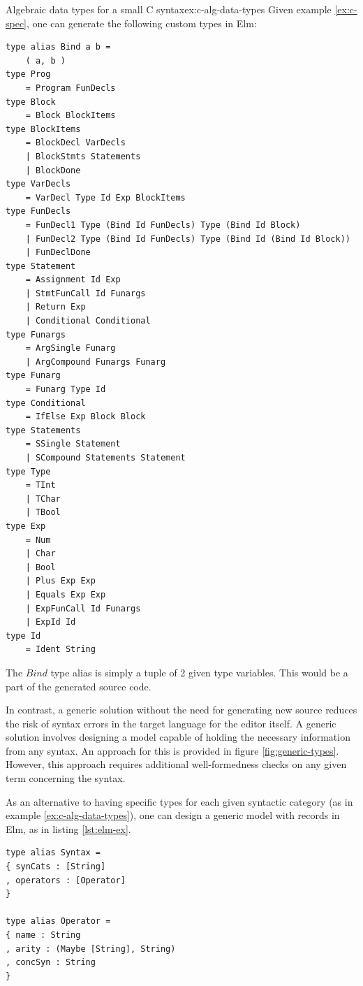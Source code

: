 \documentclass{article}
\begin{document}
\begin{example}{Algebraic data types for a small C syntax}{ex:c-alg-data-types}
Given example \ref{ex:c-spec}, one can generate the following custom types in Elm:
\begin{lstlisting}
type alias Bind a b =
    ( a, b )
type Prog
    = Program FunDecls
type Block
    = Block BlockItems
type BlockItems
    = BlockDecl VarDecls
    | BlockStmts Statements
    | BlockDone
type VarDecls
    = VarDecl Type Id Exp BlockItems
type FunDecls
    = FunDecl1 Type (Bind Id FunDecls) Type (Bind Id Block)
    | FunDecl2 Type (Bind Id FunDecls) Type (Bind Id (Bind Id Block))
    | FunDeclDone
type Statement
    = Assignment Id Exp
    | StmtFunCall Id Funargs
    | Return Exp
    | Conditional Conditional
type Funargs
    = ArgSingle Funarg
    | ArgCompound Funargs Funarg
type Funarg
    = Funarg Type Id
type Conditional
    = IfElse Exp Block Block
type Statements
    = SSingle Statement
    | SCompound Statements Statement
type Type
    = TInt
    | TChar
    | TBool
type Exp
    = Num
    | Char
    | Bool
    | Plus Exp Exp
    | Equals Exp Exp
    | ExpFunCall Id Funargs
    | ExpId Id
type Id
    = Ident String
\end{lstlisting}

The $Bind$ type alias is simply a tuple of 2 given type variables. This would be a part of the generated source code. 
\end{example}

In contrast, a generic solution without the need for generating new source reduces the risk of syntax errors in the target language for the editor itself. A generic solution involves designing a model capable of holding the necessary information from any syntax. An approach for this is provided in figure \ref{fig:generic-types}. However, this approach requires additional well-formedness checks on any given term concerning the syntax.

As an alternative to having specific types for each given syntactic category (as in example \ref{ex:c-alg-data-types}), one can design a generic model with records in Elm, as in listing \ref{lst:elm-ex}.

\begin{lstlisting}[backgroundcolor=\color{myfigurecolorback},caption={Elm Records for storing syntax information},label={lst:elm-ex}]
type alias Syntax =
{ synCats : [String]
, operators : [Operator]
}

type alias Operator =
{ name : String
, arity : (Maybe [String], String)
, concSyn : String
}
\end{lstlisting}
\end{document}

